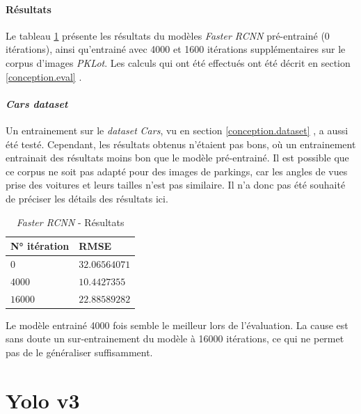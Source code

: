 \paragraph{Résultats}

Le tableau \ref{tab:rcnn_results} présente les résultats du modèles \textit{Faster RCNN} pré-entrainé (0 itérations), ainsi qu'entrainé avec 4000 et 1600 itérations supplémentaires sur le corpus d'images \textit{PKLot}. Les calculs qui ont été effectués ont été décrit en section \ref{conception.eval} .

\paragraph{\textit{Cars dataset}}

Un entrainement sur le \textit{dataset} \textit{Cars}, vu en section \ref{conception.dataset} , a aussi été testé. Cependant, les résultats obtenus n'étaient pas bons, où un entrainement entrainait des résultats moins bon que le modèle pré-entrainé. Il est possible que ce corpus ne soit pas adapté pour des images de parkings, car les angles de vues prise des voitures et leurs tailles n'est pas similaire. Il n'a donc pas été souhaité de préciser les détails des résultats ici.

\begin{table}[ht]
\centering
\begin{tabular}{@{}ll@{}}
\toprule
N° itération & RMSE \\ \midrule
$0$            & $32.06564071$ \\
$4000$         & $10.4427355$ \\
$16000$        & $22.88589282$ \\ \bottomrule
\end{tabular}
\caption{\textit{Faster RCNN} - Résultats}
\label{tab:rcnn_results}
\end{table}

Le modèle entrainé 4000 fois semble le meilleur lors de l'évaluation. La cause est sans doute un sur-entrainement du modèle à 16000 itérations, ce qui ne permet pas de le généraliser suffisamment.


\section{Yolo v3}

